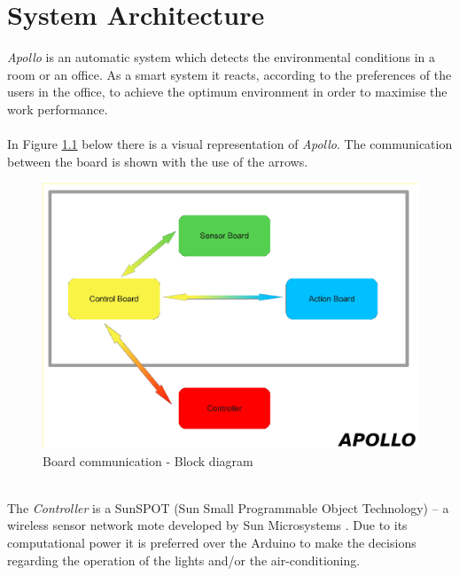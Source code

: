 \documentclass[12pt,a4paper]{report}
\begin{document}
\chapter{System Architecture}
%
\emph{Apollo} is an automatic system which detects the environmental conditions in a room or an office.
As a smart system it reacts, according to the preferences of the users in the office, to achieve the optimum environment in order to maximise the work performance.\\
\ \\
In Figure \ref{arch_design} below there is a visual representation of \emph{Apollo}. The communication between the board is shown with the use of the arrows.\\
%
\begin{figure}[H]
\centering
\includegraphics*[scale=0.35]{architecture_design}
\caption{Board communication - Block diagram}
\label{arch_design}
\end{figure}
\ \\
The \textit{Controller} is a SunSPOT (Sun Small Programmable Object Technology) -- a wireless sensor network mote developed by Sun Microsystems \cite{website:sunspot}. 
Due to its computational power it is preferred over the Arduino to make the decisions regarding the operation of the lights and/or the air-conditioning.\label{Controller} \\ 
\ \\
\end{document}
